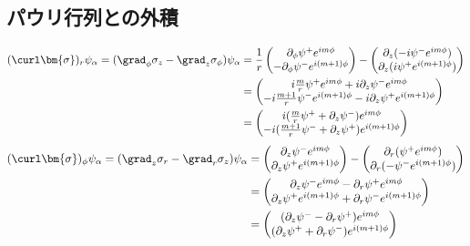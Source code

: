 \documentclass[a4paper,11pt,uplatex]{jsarticle}%
\begin{document}
\subsection*{パウリ行列との外積}
\begin{align}
  (\curl\bm{\sigma})_r\psi_{\alpha} = (\grad_{\phi}\sigma_z - \grad_{z}\sigma_{\phi})\psi_{\alpha}
   & = \frac{1}{r}
  \begin{pmatrix}
    \partial_{\phi}\psi^{+}e^{im\phi} \\
    -\partial_{\phi}\psi^{-}e^{i(m+1)\phi}
  \end{pmatrix}
  -\begin{pmatrix}
     \partial_{z}(-i\psi^{-}e^{im\phi}) \\
     \partial_{z}(i\psi^{+}e^{i(m+1)\phi})
   \end{pmatrix} \\
   & =
  \begin{pmatrix}
    i\frac{m}{r}\psi^{+}e^{im\phi}  + i\partial_z \psi^{-}e^{im\phi} \\
    -i\frac{m+1}{r}\psi^{-}e^{i(m+1)\phi} - i\partial_z \psi^{+}e^{i(m+1)\phi}
  \end{pmatrix} \\
  &= 
  \begin{pmatrix}
    i(\frac{m}{r}\psi^{+} + \partial_z \psi^{-})e^{im\phi} \\
    -i(\frac{m+1}{r}\psi^{-} + \partial_z \psi^{+})e^{i(m+1)\phi}
  \end{pmatrix}
\end{align}
\begin{align}
  (\curl\bm{\sigma})_{\phi}\psi_{\alpha} = (\grad_{z}\sigma_r - \grad_{r}\sigma_{z})\psi_{\alpha}
   & =
  \begin{pmatrix}
    \partial_{z}\psi^{-}e^{im\phi} \\
    \partial_{z}\psi^{+}e^{i(m+1)\phi}
  \end{pmatrix}
  -\begin{pmatrix}
     \partial_{r}(\psi^{+}e^{im\phi}) \\
     \partial_{r}(-\psi^{-}e^{i(m+1)\phi})
   \end{pmatrix} \\
   & =
  \begin{pmatrix}
    \partial_z \psi^{-}e^{im\phi} - \partial_r \psi^{+}e^{im\phi} \\
    \partial_z \psi^{+}e^{i(m+1)\phi} + \partial_r \psi^{-}e^{i(m+1)\phi}
  \end{pmatrix} \\
  &= 
  \begin{pmatrix}
    (\partial_z \psi^{-}- \partial_r \psi^{+})e^{im\phi} \\
    (\partial_z \psi^{+} + \partial_r \psi^{-})e^{i(m+1)\phi}
  \end{pmatrix}
\end{align}
\end{document}
